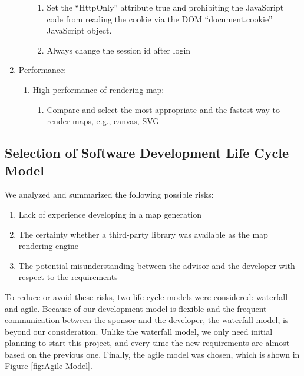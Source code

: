 \begin{enumerate}
\begin{enumerate}
\begin{enumerate}
      \item Set the ``HttpOnly'' attribute true and prohibiting the JavaScript code from reading the cookie via the DOM ``document.cookie'' JavaScript object.
      \item Always change the session id after login
    \end{enumerate}
  \end{enumerate}
  \item Performance:
  \begin{enumerate}
    \item High performance of rendering map:
    \begin{enumerate}
      \item Compare and select the most appropriate and the fastest way to render maps, e.g., canvas, SVG
    \end{enumerate}
  \end{enumerate}
\end{enumerate}

\subsection{Selection of Software Development Life Cycle Model}
\label{sec:Requirements>SDLC}
We analyzed and summarized the following possible risks:
\begin{enumerate}
  \item Lack of experience developing in a map generation
  \item The certainty whether a third-party library was available as the map rendering engine
  \item The potential misunderstanding between the advisor and the developer with respect to the requirements
\end{enumerate}

To reduce or avoid these risks, two life cycle models were considered: waterfall and agile. Because of our development model is flexible and the frequent communication between the sponsor and the developer, the waterfall model, is beyond our consideration. Unlike the waterfall model, we only need initial planning to start this project, and every time the new requirements are almost based on the previous one. Finally, the agile model was chosen, which is shown in Figure \ref{fig:Agile Model}.

